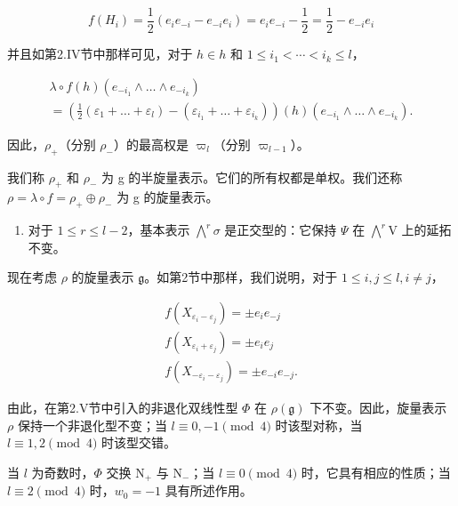 \[
f (H _ {i}) = \frac {1}{2} (e _ {i} e _ {- i} - e _ {- i} e _ {i}) = e _ {i} e _ {- i} - \frac {1}{2} = \frac {1}{2} - e _ {- i} e _ {i}
\]

并且如第2.IV节中那样可见，对于 \(h \in h\) 和 \(1 \leq i_{1} < \cdots < i_{k} \leq l\)，

\[
\begin{array}{l} \lambda \circ f (h) (e _ {- i _ {1}} \wedge \dots \wedge e _ {- i _ {k}}) \\ = (\frac {1}{2} (\varepsilon_ {1} + \dots + \varepsilon_ {l}) - (\varepsilon_ {i _ {1}} + \dots + \varepsilon_ {i _ {k}})) (h) (e _ {- i _ {1}} \wedge \dots \wedge e _ {- i _ {k}}). \end{array}
\]

因此，\(\rho_{+}\)（分别 \(\rho_{-}\)）的最高权是 \(\varpi_{l}\)（分别 \(\varpi_{l-1}\)）。

我们称 \(\rho_{+}\) 和 \(\rho_{-}\) 为 g 的半旋量表示。它们的所有权都是单权。我们还称 \(\rho = \lambda \circ f = \rho_{+} \oplus \rho_{-}\) 为 g 的旋量表示。

\begin{enumerate}
\def\labelenumi{(\Alph{enumi})}
\setcounter{enumi}{21}
\tightlist
\item
对于 \(1 \leq r \leq l - 2\)，基本表示 \(\bigwedge^{r} \sigma\) 是正交型的：它保持 \(\varPsi\) 在 \(\bigwedge^{r} \mathrm{V}\) 上的延拓不变。
\end{enumerate}

现在考虑 \(\rho\) 的旋量表示 \(\mathfrak{g}\)。如第2节中那样，我们说明，对于 \(1 \leq i, j \leq l, i \neq j\)，

\[
\begin{array}{r} f (X _ {\varepsilon_ {i} - \varepsilon_ {j}}) = \pm e _ {i} e _ {- j} \\ f (X _ {\varepsilon_ {i} + \varepsilon_ {j}}) = \pm e _ {i} e _ {j} \\ f (X _ {- \varepsilon_ {i} - \varepsilon_ {j}}) = \pm e _ {- i} e _ {- j}. \end{array}
\]

由此，在第2.V节中引入的非退化双线性型 \(\varPhi\) 在 \(\rho(\mathfrak{g})\) 下不变。因此，旋量表示 \(\rho\) 保持一个非退化型不变；当 \(l \equiv 0, -1 \pmod{4}\) 时该型对称，当 \(l \equiv 1, 2 \pmod{4}\) 时该型交错。

当 \(l\) 为奇数时，\(\varPhi\) 交换 \(\mathrm{N}_{+}\) 与 \(\mathrm{N}_{-}\)；当 \(l \equiv 0 \pmod{4}\) 时，它具有相应的性质；当 \(l \equiv 2 \pmod{4}\) 时，\(w_{0} = -1\) 具有所述作用。

